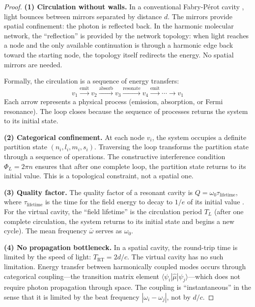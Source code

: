 \documentclass[11pt,a4paper]{article}
\theoremstyle{definition}
\theoremstyle{remark}
\begin{document}
\begin{proof}
\textbf{(1) Circulation without walls.} In a conventional Fabry-P\'{e}rot cavity \citep{fabry1899, siegman1986}, light bounces between mirrors separated by distance $d$. The mirrors provide spatial confinement: the photon is reflected back. In the harmonic molecular network, the ``reflection'' is provided by the network topology: when light reaches a node and the only available continuation is through a harmonic edge back toward the starting node, the topology itself redirects the energy. No spatial mirrors are needed.

Formally, the circulation is a sequence of energy transfers:
\begin{equation}
v_1 \xrightarrow{\text{emit}} v_2 \xrightarrow{\text{absorb}} v_3 \xrightarrow{\text{resonate}} v_4 \xrightarrow{\text{emit}} \cdots \xrightarrow{} v_1
\end{equation}
Each arrow represents a physical process (emission, absorption, or Fermi resonance). The loop closes because the sequence of processes returns the system to its initial state.

\textbf{(2) Categorical confinement.} At each node $v_i$, the system occupies a definite partition state $(n_i, l_i, m_i, s_i)$. Traversing the loop transforms the partition state through a sequence of operations. The constructive interference condition $\Phi_L = 2\pi n$ ensures that after one complete loop, the partition state returns to its initial value. This is a topological constraint, not a spatial one.

\textbf{(3) Quality factor.} The quality factor of a resonant cavity is $Q = \omega_0 \tau_{\mathrm{lifetime}}$, where $\tau_{\mathrm{lifetime}}$ is the time for the field energy to decay to $1/e$ of its initial value \citep{siegman1986, vahala2003}. For the virtual cavity, the ``field lifetime'' is the circulation period $T_L$ (after one complete circulation, the system returns to its initial state and begins a new cycle). The mean frequency $\bar{\omega}$ serves as $\omega_0$.

\textbf{(4) No propagation bottleneck.} In a spatial cavity, the round-trip time is limited by the speed of light: $T_{\mathrm{RT}} = 2d/c$. The virtual cavity has no such limitation. Energy transfer between harmonically coupled modes occurs through categorical coupling---the transition matrix element $\langle \psi_i | \hat{\mu} | \psi_j \rangle$---which does not require photon propagation through space. The coupling is ``instantaneous'' in the sense that it is limited by the beat frequency $|\omega_i - \omega_j|$, not by $d/c$.
\end{proof}
\end{document}
